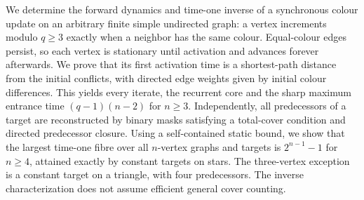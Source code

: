 We determine the forward dynamics and time-one inverse of a synchronous
colour update on an arbitrary finite simple undirected graph: a vertex
increments modulo $q\ge3$ exactly when a neighbor has the same colour.
Equal-colour edges persist, so each vertex is stationary until activation
and advances forever afterwards. We prove that its first activation time
is a shortest-path distance from the initial conflicts, with directed edge
weights given by initial colour differences. This yields every iterate,
the recurrent core and the sharp maximum entrance time $(q-1)(n-2)$ for
$n\ge3$. Independently, all predecessors of a target are reconstructed by
binary masks satisfying a total-cover condition and directed predecessor
closure. Using a self-contained static bound, we show that the largest
time-one fibre over all $n$-vertex graphs and targets is $2^{n-1}-1$ for
$n\ge4$, attained exactly by constant targets on stars. The three-vertex
exception is a constant target on a triangle, with four predecessors.
The inverse characterization does not assume efficient general cover counting.
